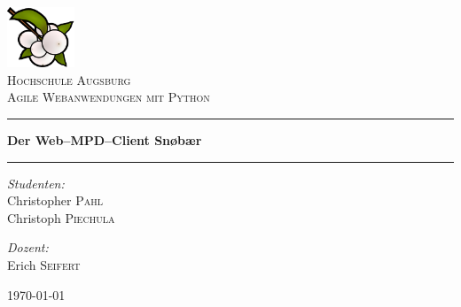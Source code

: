 \begin{titlepage}
\begin{center}

\includegraphics[width=0.15\textwidth]{docs/pics/logo.png}~\\[1cm]
\textsc{\LARGE Hochschule Augsburg}\\[1.5cm]
\textsc{\Large Agile Webanwendungen mit Python}\\[0.5cm]

\rule{\linewidth}{0.5mm}
{ \huge \bfseries Der Web--MPD--Client Snøbær\\[0.4cm] }
\rule{\linewidth}{0.5mm}

\noindent
\begin{minipage}[t]{0.4\textwidth}
\begin{flushleft} \large
\emph{Studenten:}\\
Christopher \textsc{Pahl}\\Christoph \textsc{Piechula}
\end{flushleft}
\end{minipage}%
\begin{minipage}[t]{0.4\textwidth}
\begin{flushright} \large
\emph{Dozent:} \\
Erich \textsc{Seifert}
\end{flushright}
\end{minipage}

\vfill

{\large \today}
\end{center}
\end{titlepage}
